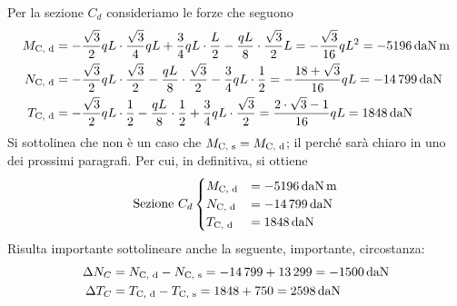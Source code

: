 Per la sezione $C_d$ consideriamo le forze che seguono
\begin{align*}
M_{\textup{C, d}} &= -\frac{\sqrt{3}}{2}qL \cdot \frac{\sqrt{3}}{4}qL + \frac{3}{4}qL \cdot \frac{L}{2} - \frac{qL}{8}\cdot \frac{\sqrt{3}}{2}L = -\frac{\sqrt{3}}{16} qL^{2} = - \SI{5196}{daN.m} \\
N_{\textup{C, d}} &= -\frac{\sqrt{3}}{2}qL \cdot \frac{\sqrt{3}}{2} - \frac{qL}{8} \cdot \frac{\sqrt{3}}{2} - \frac{3}{4}qL\cdot \frac{1}{2} = - \frac{18+\sqrt{3}}{16} qL = - \SI{14799}{daN} \\
T_{\textup{C, d}} &= - \frac{\sqrt{3}}{2}qL\cdot \frac{1}{2} - \frac{qL}{8} \cdot \frac{1}{2} + \frac{3}{4}qL \cdot \frac{\sqrt{3}}{2} = \frac{2\cdot\sqrt{3} - 1}{16}qL = \SI{1848}{daN}
\end{align*}
Si sottolinea che non è un caso che $M_{\textup{C, s}} = M_{\textup{C, d}}$; il perché sarà chiaro in uno dei prossimi paragrafi. Per cui, in definitiva, si ottiene
\begin{equation*}
\text{Sezione } C_{d} 
\begin{cases}
M_{\textup{C, d}} &=  - \SI{5196}{daN.m} \\
N_{\textup{C, d}} &=  - \SI{14799}{daN} \\
T_{\textup{C, d}} & = \SI{1848}{daN}
\end{cases}
\end{equation*}
Risulta importante sottolineare anche la seguente, importante, circostanza:
\begin{align*}
\Delta N_{C} &= N_{\textup{C, d}} - N_{\textup{C, s}} = - \SI{14799}{} + \SI{13299}{} = -\SI{1500}{daN} \\
\Delta T_{C} &= T_{\textup{C, d}} - T_{\textup{C, s}} = \SI{1848}{} + \SI{750}{} = \SI{2598}{daN} 
\end{align*}
\renewcommand{\thefigure}{11.1~-~5}
